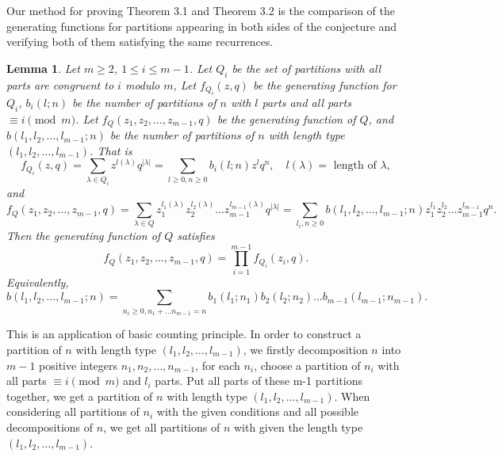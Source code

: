 \documentclass[draft]{amsart}
\numberwithin{equation}{section}
\theoremstyle{plain}
\newtheorem{lemma}[theorem]{Lemma}
\theoremstyle{remark}
\begin{document}
Our method for proving Theorem 3.1 and Theorem 3.2 is the comparison of the generating functions for partitions appearing in both sides of the conjecture and verifying both of them satisfying the same recurrences.
\begin{lemma}
Let $m\geq 2$, $1\leq i\leq m-1$. Let $Q_{i}$ be the set of partitions with all parts are congruent to $i$ modulo $m$, Let $f_{Q_{i}}(z,q)$ be the generating function for $Q_{i}$, $b_{i}(l; n)$ be the number of partitions of $n$ with $l$ parts and all parts $\equiv i\pmod m$.  Let $f_{Q}(z_{1}, z_{2}, \dots, z_{m-1},q)$ be the generating function of $Q$, and $b(l_{1}, l_{2}, \dots, l_{m-1}; n)$ be the number of partitions of $n$ with length type $(l_{1}, l_{2}, \dots, l_{m-1})$. That is
$$
f_{Q_{i}}(z,q)=\sum_{\lambda \in Q_{i}}z^{l(\lambda)} q^{|\lambda |}   =\sum_{l\geq 0,n\geq0}b_{i}(l;n)z^{l}q^{n}, \quad  l(\lambda)=\mbox{ length of } \lambda,
$$
and
$$
f_{Q}(z_{1}, z_{2}, \dots, z_{m-1},q)=\sum_{\lambda \in Q}z_{1}^{l_{1}(\lambda)}z_{2}^{l_{2}(\lambda)}\dots z_{m-1}^{l_{m-1}(\lambda)}q^{|\lambda |}=\sum_{l_{i}, n\geq 0} b(l_{1}, l_{2}, \dots, l_{m-1}; n) z_{1}^{l_{1}}z_{2}^{l_{2}}\dots z_{m-1}^{l_{m-1}}q^{n}.
$$
Then the generating function of $Q$ satisfies
$$
f_{Q}(z_{1}, z_{2}, \dots, z_{m-1},q)=\prod_{i=1}^{m-1}f_{Q_{i}}(z_{i}, q).
$$
Equivalently, 
$$
b(l_{1}, l_{2}, \dots, l_{m-1}; n)=\sum_{n_{i}\geq 0, n_{1}+\dots n_{m-1}=n} b_{1}(l_{1};n_{1})b_{2}(l_{2};n_{2})\dots b_{m-1}(l_{m-1}; n_{m-1}).
$$
\end{lemma}
This is an application of basic counting principle. In order to construct a partition of $n$ with length type $(l_{1}, l_{2}, \dots, l_{m-1})$, we firstly decomposition $n$ into $m-1$ positive integers $n_{1}, n_{2},\dots, n_{m-1}$, for  each $n_{i}$, choose 
a partition of $n_{i}$ with all parts $\equiv i \pmod m$ and $l_{i}$ parts. Put all parts of these m-1 partitions together, we get a partition of $n$ with length type $(l_{1}, l_{2}, \dots, l_{m-1})$. When considering all partitions of $n_{i}$ with the given conditions and  all possible decompositions of $n$, we get all partitions of $n$ with given the length type $(l_{1}, l_{2}, \dots, l_{m-1})$.
\end{document}
